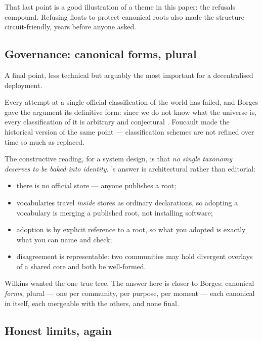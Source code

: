 That last point is a good illustration of a theme in this paper: the refusals
compound. Refusing floats to protect canonical roots also made the structure
circuit-friendly, years before anyone asked.

\subsection{Governance: canonical forms, plural}

A final point, less technical but arguably the most important for a
decentralised deployment.

Every attempt at a single official classification of the world has failed, and
Borges gave the argument its definitive form: since we do not know what the
universe is, every classification of it is arbitrary and conjectural
\citep{borges1942}. Foucault made the historical version of the same point ---
classification schemes are not refined over time so much as replaced.

The constructive reading, for a system design, is that \emph{no single
taxonomy deserves to be baked into identity}. \odag{}'s answer is
architectural rather than editorial:

\begin{itemize}[leftmargin=1.4em]
\item there is no official store --- anyone publishes a root;
\item vocabularies travel \emph{inside} stores as ordinary declarations, so
  adopting a vocabulary is merging a published root, not installing software;
\item adoption is by explicit reference to a root, so what you adopted is
  exactly what you can name and check;
\item disagreement is representable: two communities may hold divergent
  overlays of a shared core and both be well-formed.
\end{itemize}

Wilkins wanted the one true tree. The answer here is closer to Borges:
canonical \emph{forms}, plural --- one per community, per purpose, per moment
--- each canonical in itself, each mergeable with the others, and none final.

\subsection{Honest limits, again}

